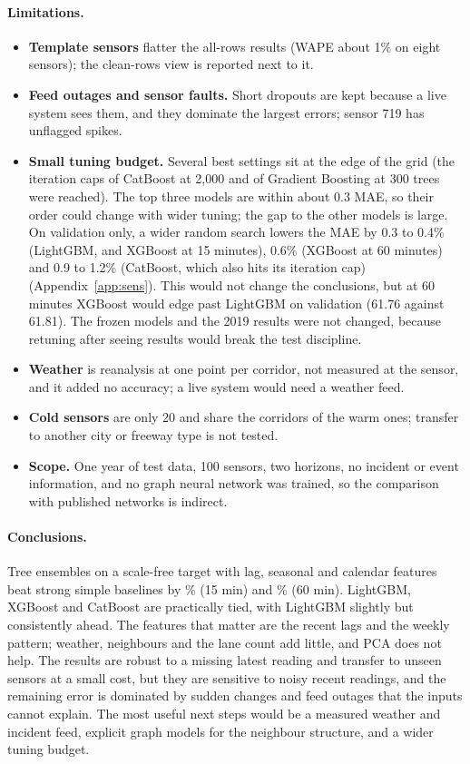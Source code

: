 \documentclass[11pt,a4paper]{article}
\begin{document}
\paragraph{Limitations.}
\begin{itemize}
\item \textbf{Template sensors} flatter the all-rows results (WAPE about 1\% on eight sensors); the clean-rows view is reported next to it.
\item \textbf{Feed outages and sensor faults.} Short dropouts are kept because a live system sees them, and they dominate the largest errors; sensor 719 has unflagged spikes.
\item \textbf{Small tuning budget.} Several best settings sit at the edge of the grid (the iteration caps of CatBoost at 2{,}000 and of Gradient Boosting at 300 trees were reached). The top three models are within about 0.3 MAE, so their order could change with wider tuning; the gap to the other models is large. On validation only,
a wider random search lowers the MAE by 0.3 to 0.4\% (LightGBM, and XGBoost at 15 minutes), 0.6\% (XGBoost at 60 minutes) and 0.9 to 1.2\% (CatBoost, which also hits its iteration cap) (Appendix~\ref{app:sens}). This would not change the conclusions, but at 60 minutes XGBoost would edge past LightGBM on validation (61.76 against 61.81).
The frozen models and the 2019 results were not changed, because retuning after seeing results would break the test discipline.
\item \textbf{Weather} is reanalysis at one point per corridor, not measured at the sensor, and it added no accuracy; a live system would need a weather feed.
\item \textbf{Cold sensors} are only 20 and share the corridors of the warm ones; transfer to another city or freeway type is not tested.
\item \textbf{Scope.} One year of test data, 100 sensors, two horizons, no incident or event information, and no graph neural network was trained, so the comparison with published networks is indirect.
\end{itemize}

\paragraph{Conclusions.} Tree ensembles on a scale-free target with lag, seasonal and calendar features beat strong simple baselines by \lgbmSkillFifteen\% (15 min) and \lgbmSkillSixty\% (60 min). LightGBM, XGBoost and CatBoost are practically tied, with LightGBM slightly but consistently ahead.
The features that matter are the recent lags and the weekly pattern; weather, neighbours and the lane count add little, and PCA does not help. The results are robust to a missing latest reading and transfer to unseen sensors at a small cost, but they are sensitive to noisy recent readings, and the remaining error is
dominated by sudden changes and feed outages that the inputs cannot explain. The most useful next steps would be a measured weather and incident feed, explicit graph models for the neighbour structure, and a wider tuning budget.
\end{document}

